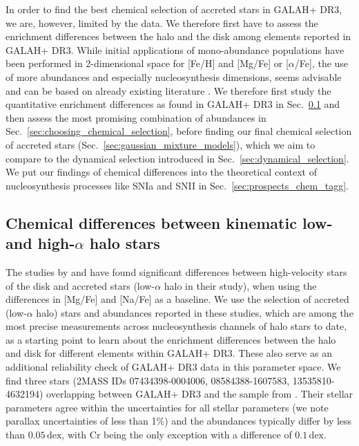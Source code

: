 \documentclass[fleqn,usenatbib]{mnras}
\newcommand{\dex}{\,\mathrm{dex}}	%
\begin{document}
In order to find the best chemical selection of accreted stars in GALAH+ DR3, we are, however, limited by the data. We therefore first have to assess the enrichment differences between the halo and the disk among elements reported in GALAH+ DR3. While initial applications of mono-abundance populations have been performed in 2-dimensional space \citep[e.g.][]{Navarro2011,DiMatteo2019,Carollo2021} for [Fe/H] and [Mg/Fe] or [$\alpha$/Fe], the use of more abundances and especially nucleosynthesis dimensions, seems advisable and can be based on already existing literature \citep{Nissen2010,Ting2012, Hawkins2015, Hayes2018, Das2020}. We therefore first study the quantitative enrichment differences as found in GALAH+ DR3 in Sec.~\ref{sec:enrichment_differences} and then assess the most promising combination of abundances in Sec.~\ref{sec:choosing_chemical_selection}, before finding our final chemical selection of accreted stars (Sec.~\ref{sec:gaussian_mixture_models}), which we aim to compare to the dynamical selection introduced in Sec.~\ref{sec:dynamical_selection}. We put our findings of chemical differences into the theoretical context of nucleosynthesis processes like SNIa and SNII in Sec.~\ref{sec:prospects_chem_tagg}.

\subsection{Chemical differences between kinematic low- and high-\texorpdfstring{$\alpha$}{alpha} halo stars} \label{sec:enrichment_differences}

The studies by \citet{Nissen2010,Nissen2011,Nissen2012} and \citet{Nissen2014} have found significant differences between high-velocity stars of the disk and accreted stars (low-$\alpha$ halo in their study), when using the differences in [Mg/Fe] and [Na/Fe] as a baseline. We use the selection of accreted (low-$\alpha$ halo) stars and abundances reported in these studies, which are among the most precise measurements across nucleosynthesis channels of halo stars to date, as a starting point to learn about the enrichment differences between the halo and disk for different elements within GALAH+ DR3. These also serve as an additional reliability check of GALAH+ DR3 data in this parameter space. We find three stars (2MASS IDs 07434398-0004006, 08584388-1607583, 13535810-4632194) overlapping between GALAH+ DR3 and the sample from \citet{Nissen2010}. Their stellar parameters agree within the uncertainties for all stellar parameters (we note parallax uncertainties of less than 1\%) and the abundances typically differ by less than $0.05\dex$, with Cr being the only exception with a difference of $0.1\dex$.
\end{document}
